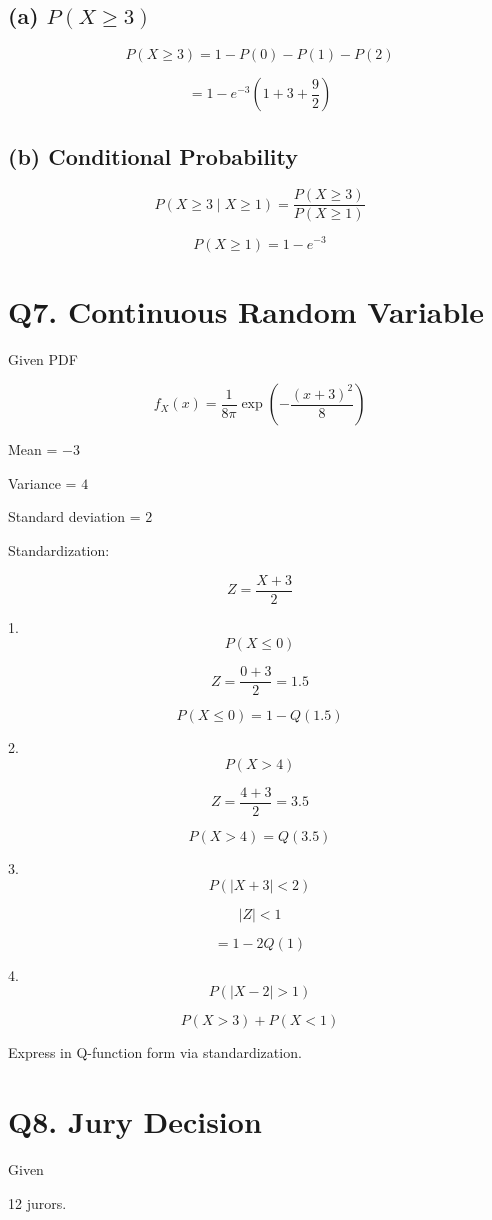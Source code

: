 \documentclass[11pt]{article}
\begin{document}
\subsection*{\textbf{(a) $P(X \ge 3)$}}

\[
P(X \ge 3)=1-P(0)-P(1)-P(2)
\]

\[
=1-e^{-3}\left(1+3+\frac{9}{2}\right)
\]

\subsection*{\textbf{(b) Conditional Probability}}

\[
P(X \ge 3 \mid X \ge 1)=\frac{P(X \ge 3)}{P(X \ge 1)}
\]

\[
P(X \ge 1)=1-e^{-3}
\]

\section*{\textbf{Q7. Continuous Random Variable}}

Given PDF

\[
f_X(x)=\frac{1}{8\pi}\exp\left(-\frac{(x+3)^2}{8}\right)
\]

Mean = $-3$

Variance = $4$

Standard deviation = $2$

Standardization:

\[
Z=\frac{X+3}{2}
\]

1. 
\[
P(X \le 0)
\]

\[
Z=\frac{0+3}{2}=1.5
\]

\[
P(X \le 0)=1-Q(1.5)
\]

2. 
\[
P(X>4)
\]

\[
Z=\frac{4+3}{2}=3.5
\]

\[
P(X>4)=Q(3.5)
\]

3. 
\[
P(|X+3|<2)
\]

\[
|Z|<1
\]

\[
=1-2Q(1)
\]

4. 
\[
P(|X-2|>1)
\]

\[
P(X>3)+P(X<1)
\]

Express in Q-function form via standardization.

\section*{\textbf{Q8. Jury Decision}}

Given

12 jurors.
\end{document}
